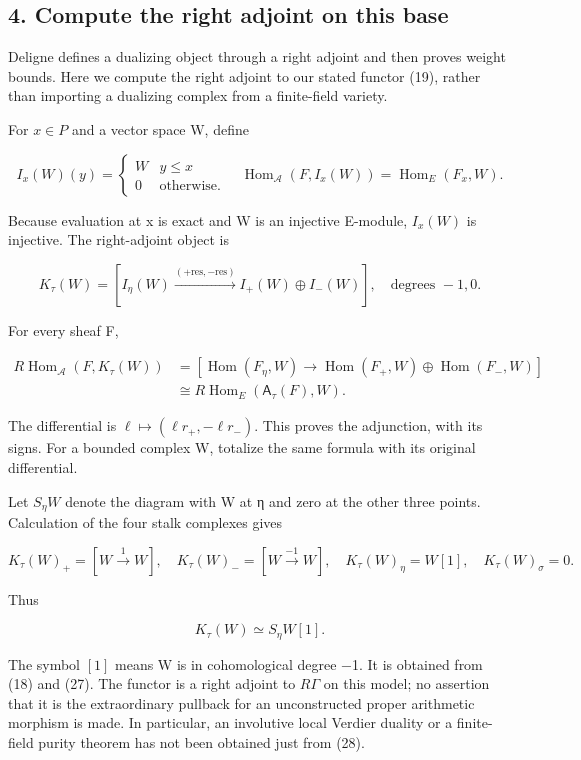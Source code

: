 \documentclass[
]{article}
\begin{document}
\subsection{4. Compute the right adjoint on this
base}\label{compute-the-right-adjoint-on-this-base}

Deligne defines a dualizing object through a right adjoint and then
proves weight bounds. Here we compute the right adjoint to our stated
functor (19), rather than importing a dualizing complex from a
finite-field variety.

For \(x\in P\) and a vector space W, define

\[
I_x(W)(y)=\begin{cases}W&y\le x\\0&\text{otherwise}.\end{cases}
\quad
\operatorname{Hom}_{\mathcal A}(F,I_x(W))
=\operatorname{Hom}_E(F_x,W).
\tag{26}
\]

Because evaluation at x is exact and W is an injective E-module,
\(I_x(W)\) is injective. The right-adjoint object is

\[
\boxed{
K_\tau(W)=
[I_\eta(W)\xrightarrow{(+\mathrm{res},-\mathrm{res})}
 I_+(W)\oplus I_-(W)],
\quad\text{degrees }-1,0.
}
\tag{27}
\]

For every sheaf F,

\[
\begin{aligned}
R\operatorname{Hom}_{\mathcal A}(F,K_\tau(W))
&=[\operatorname{Hom}(F_\eta,W)
 \longrightarrow\operatorname{Hom}(F_+,W)\oplus\operatorname{Hom}(F_-,W)]\\
&\cong R\operatorname{Hom}_E(\mathsf A_\tau(F),W).
\end{aligned}
\tag{28}
\]

The differential is \(\ell\mapsto(\ell r_+,-\ell r_-)\). This proves the
adjunction, with its signs. For a bounded complex W, totalize the same
formula with its original differential.

Let \(S_\eta W\) denote the diagram with W at η and zero at the other
three points. Calculation of the four stalk complexes gives

\[
K_\tau(W)_+=[W\xrightarrow{1}W],\quad
K_\tau(W)_-=[W\xrightarrow{-1}W],\quad
K_\tau(W)_\eta=W[1],\quad K_\tau(W)_\sigma=0.
\tag{29}
\]

Thus

\[
\boxed{K_\tau(W)\simeq S_\eta W[1].}
\tag{30}
\]

The symbol \([1]\) means W is in cohomological degree −1. It is obtained
from (18) and (27). The functor is a right adjoint to \(R\Gamma\) on
this model; no assertion that it is the extraordinary pullback for an
unconstructed proper arithmetic morphism is made. In particular, an
involutive local Verdier duality or a finite-field purity theorem has
not been obtained just from (28).
\end{document}
